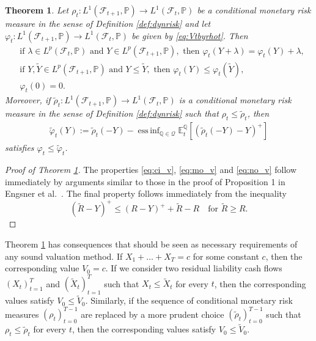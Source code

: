 \documentclass[11pt,a4paper]{article}
\newtheorem{theorem}{Theorem}
\newcommand{\E}{\mathbb{E}}
\DeclareMathOperator*{\essinf}{ess\,inf}
\renewcommand{\P}{\mathbb{P}}
\newcommand{\Q}{\mathbb{Q}}
\renewcommand{\phi}{\varphi}
\newcommand{\calF}{\mathcal{F}}
\newcommand{\calQ}{\mathcal{Q}}
\begin{document}
\begin{theorem}\label{phitproperties}
Let $\rho_t:L^1(\calF_{t+1},\P)\to L^1(\calF_t,\P)$ be a conditional monetary risk measure in the sense of Definition \ref{def:dynrisk} and let $\phi_t:L^1(\calF_{t+1},\P)\to L^1(\calF_t,\P)$ be given by \eqref{eq:Vtbyrhot}. Then 
\begin{align}
& \textrm{if } \lambda\in L^p(\calF_t,\P) \textrm{ and } Y\in L^p(\calF_{t+1},\P), \textrm{ then } 
\phi_t(Y+\lambda)=\phi_t(Y)+\lambda,  \label{eq:ci_v}\\
& \textrm{if } Y,\widetilde{Y}\in L^p(\calF_{t+1},\P) \textrm{ and } Y\leq \widetilde{Y}, \textrm{ then } 
\phi_t(Y)\leq \phi_t(\widetilde{Y}),  \label{eq:mo_v}\\
& \phi_t(0)=0. \label{eq:no_v}
\end{align}
Moreover, if $\widetilde{\rho}_t:L^1(\calF_{t+1},\P)\to L^1(\calF_t,\P)$ is a conditional monetary risk measure in the sense of Definition \ref{def:dynrisk} such that $\rho_t\leq \widetilde{\rho}_t$, then 
\begin{align*}
\widetilde{\phi}_t(Y) := \widetilde{\rho}_t(-Y)-\essinf_{\Q \in \calQ} \E_t^{\Q}[(\widetilde{\rho}_t(-Y)-Y)^+]
\end{align*}
satisfies $\phi_t\leq \widetilde{\phi}_t$.
\end{theorem}
\begin{proof}[Proof of Theorem \ref{phitproperties}]
The properties \eqref{eq:ci_v}, \eqref{eq:mo_v} and \eqref{eq:no_v} follow immediately by arguments similar to those in the proof of Proposition 1 in Engsner et al.~\cite{Engsner-Lindholm-Lindskog-17}. The final property follows immediately from the inequality 
$$
(\widetilde{R}-Y)^+\leq (R-Y)^++\widetilde{R}-R \quad \text{for } \widetilde{R}\geq R.
$$
\end{proof}
Theorem \ref{phitproperties} has consequences that should be seen as necessary requirements of any sound valuation method. If $X_1+\dots+X_T=c$ for some constant $c$, then the corresponding value $V_0=c$. If we consider two residual liability cash flows $(X_t)_{t=1}^T$ and $(\widetilde{X}_t)_{t=1}^T$ such that $X_t\leq \widetilde{X}_t$ for every $t$, then the corresponding values satisfy $V_0\leq \widetilde{V}_0$. Similarly, if the sequence of conditional monetary risk measures $(\rho_t)_{t=0}^{T-1}$
are replaced by a more prudent choice $(\widetilde{\rho}_t)_{t=0}^{T-1}$ such that $\rho_t\leq \widetilde{\rho}_t$ for every $t$, then the corresponding values satisfy $V_0\leq \widetilde{V}_0$. 
\end{document}
